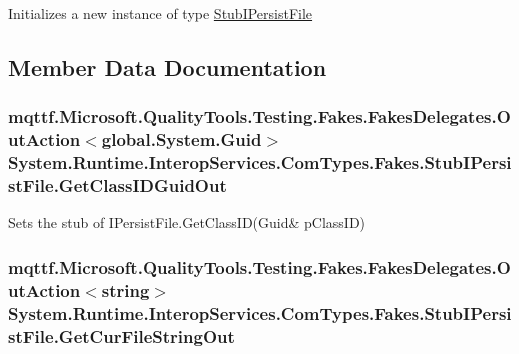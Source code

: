 Initializes a new instance of type \hyperlink{class_system_1_1_runtime_1_1_interop_services_1_1_com_types_1_1_fakes_1_1_stub_i_persist_file}{Stub\-I\-Persist\-File}



\subsection{Member Data Documentation}
\hypertarget{class_system_1_1_runtime_1_1_interop_services_1_1_com_types_1_1_fakes_1_1_stub_i_persist_file_ab9f36122f62a5495cd82ee8480b2326e}{
\subsubsection[{Get\-Class\-I\-D\-Guid\-Out}]{\setlength{\rightskip}{0pt plus 5cm}mqttf.\-Microsoft.\-Quality\-Tools.\-Testing.\-Fakes.\-Fakes\-Delegates.\-Out\-Action$<$global.\-System.\-Guid$>$ System.\-Runtime.\-Interop\-Services.\-Com\-Types.\-Fakes.\-Stub\-I\-Persist\-File.\-Get\-Class\-I\-D\-Guid\-Out}}\label{class_system_1_1_runtime_1_1_interop_services_1_1_com_types_1_1_fakes_1_1_stub_i_persist_file_ab9f36122f62a5495cd82ee8480b2326e}


Sets the stub of I\-Persist\-File.\-Get\-Class\-I\-D(Guid\& p\-Class\-I\-D)

\hypertarget{class_system_1_1_runtime_1_1_interop_services_1_1_com_types_1_1_fakes_1_1_stub_i_persist_file_a521c3581ffbe512fd104f74f444f4ad9}{
\subsubsection[{Get\-Cur\-File\-String\-Out}]{\setlength{\rightskip}{0pt plus 5cm}mqttf.\-Microsoft.\-Quality\-Tools.\-Testing.\-Fakes.\-Fakes\-Delegates.\-Out\-Action$<$string$>$ System.\-Runtime.\-Interop\-Services.\-Com\-Types.\-Fakes.\-Stub\-I\-Persist\-File.\-Get\-Cur\-File\-String\-Out}}\label{class_system_1_1_runtime_1_1_interop_services_1_1_com_types_1_1_fakes_1_1_stub_i_persist_file_a521c3581ffbe512fd104f74f444f4ad9}


